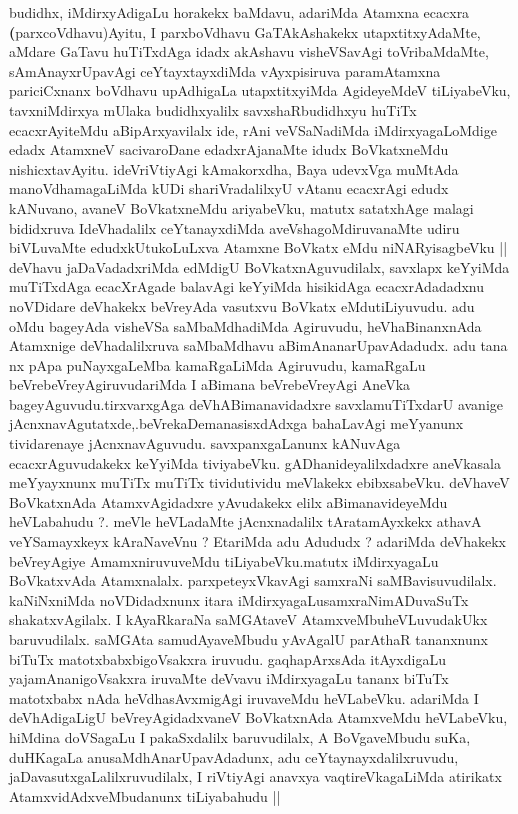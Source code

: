 \begin{artha}
budidhx, iMdirxyAdigaLu horakekx baMdavu, adariMda Atamxna ecacxra
\textbf(parxcoVdhavu)Ayitu, I parxboVdhavu GaTAkAshakekx
utapxtitxyAdaMte, aMdare GaTavu huTiTxdAga idadx akAshavu visheVSavAgi
toVribaMdaMte, sAmAnayxrUpavAgi ceYtayxtayxdiMda vAyxpisiruva
paramAtamxna pariciCxnanx boVdhavu upAdhigaLa utapxtitxyiMda
AgideyeMdeV tiLiyabeVku, tavxniMdirxya mUlaka budidhxyalilx
savxshaRbudidhxyu huTiTx ecacxrAyiteMdu aBipArxyavilalx ide, rAni
veVSaNadiMda iMdirxyagaLoMdige edadx AtamxneV sacivaroDane
edadxrAjanaMte idudx BoVkatxneMdu nishicxtavAyitu. ideVriVtiyAgi
kAmakorxdha, Baya udevxVga muMtAda manoVdhamagaLiMda kUDi
shariVradalilxyU  vAtanu ecacxrAgi edudx kANuvano, avaneV BoVkatxneMdu
ariyabeVku, matutx satatxhAge malagi bididxruva IdeVhadalilx
ceYtanayxdiMda aveVshagoMdiruvanaMte udiru biVLuvaMte
edudxkUtukoLuLxva Atamxne BoVkatx eMdu niNARyisagbeVku || deVhavu
jaDaVadadxriMda edMdigU BoVkatxnAguvudilalx, savxlapx keYyiMda
muTiTxdAga ecacXrAgade balavAgi keYyiMda hisikidAga ecacxrAdadadxnu
noVDidare deVhakekx beVreyAda vasutxvu BoVkatx eMdutiLiyuvudu. adu
oMdu bageyAda visheVSa saMbaMdhadiMda Agiruvudu, heVhaBinanxnAda
Atamxnige deVhadalilxruva saMbaMdhavu aBimAnanarUpavAdadudx. adu tana
nx pApa puNayxgaLeMba kamaRgaLiMda Agiruvudu, kamaRgaLu
beVrebeVreyAgiruvudariMda I aBimana beVrebeVreyAgi AneVka
bageyAguvudu.tirxvarxgAga deVhABimanavidadxre savxlamuTiTxdarU avanige
jAcnxnavAgutatxde,.beVrekaDemanasisxdAdxga bahaLavAgi meYyanunx
tividarenaye jAcnxnavAguvudu. savxpanxgaLanunx kANuvAga
ecacxrAguvudakekx keYyiMda tiviyabeVku. gADhanideyalilxdadxre
aneVkasala meYyayxnunx muTiTx muTiTx tividutividu meVlakekx
ebibxsabeVku. deVhaveV BoVkatxnAda AtamxvAgidadxre yAvudakekx elilx
aBimanavideyeMdu heVLabahudu ?. meVle heVLadaMte jAcnxnadalilx
tAratamAyxkekx athavA veYSamayxkeyx kAraNaveVnu ? EtariMda adu Adududx
? adariMda deVhakekx beVreyAgiye AmamxniruvuveMdu tiLiyabeVku.matutx
iMdirxyagaLu BoVkatxvAda Atamxnalalx. parxpeteyxVkavAgi samxraNi
saMBavisuvudilalx. kaNiNxniMda noVDidadxnunx itara
iMdirxyagaLusamxraNimADuvaSuTx shakatxvAgilalx. I kAyaRkaraNa
saMGAtaveV AtamxveMbuheVLuvudakUkx baruvudilalx. saMGAta
samudAyaveMbudu yAvAgalU parAthaR tananxnunx biTuTx
matotxbabxbigoVsakxra iruvudu. gaqhapArxsAda itAyxdigaLu
yajamAnanigoVsakxra iruvaMte deVvavu iMdirxyagaLu tananx biTuTx
matotxbabx nAda heVdhasAvxmigAgi iruvaveMdu heVLabeVku. adariMda I
deVhAdigaLigU beVreyAgidadxvaneV BoVkatxnAda AtamxveMdu heVLabeVku,
hiMdina doVSagaLu I pakaSxdalilx baruvudilalx, A BoVgaveMbudu suKa,
duHKagaLa anusaMdhAnarUpavAdadunx, adu ceYtaynayxdalilxruvudu,
jaDavasutxgaLalilxruvudilalx, I riVtiyAgi anavxya vaqtireVkagaLiMda
atirikatx AtamxvidAdxveMbudanunx tiLiyabahudu ||
\end{artha}

